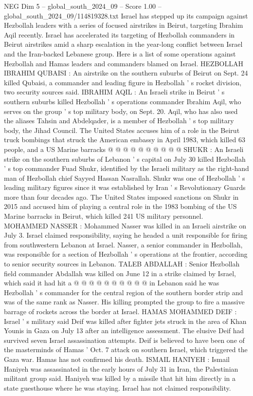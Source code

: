 \begin{textsample}{NEG Dim 5 – global\_south\_2024\_09 – Score 1.00 – global\_south\_2024\_09/114819328.txt}  \label{ex:f5_neg_221}
Israel has stepped up its campaign against Hezbollah leaders with a series of focused airstrikes in Beirut, targeting Ibrahim Aqil recently.
Israel has accelerated its targeting of Hezbollah commanders in Beirut airstrikes amid a sharp escalation in the year-long conflict between Israel and the Iran-backed Lebanese group.
Here is a list of some operations against Hezbollah and Hamas leaders and commanders blamed on Israel.
HEZBOLLAH IBRAHIM QUBAISI : An airstrike on the southern suburbs of Beirut on Sept. 24 killed Qubaisi, a commander and leading figure in Hezbollah ' s rocket division, two security sources said.
IBRAHIM AQIL : An Israeli strike in Beirut ' s southern suburbs killed Hezbollah ' s operations commander Ibrahim Aqil, who serves on the group ' s top military body, on Sept. 20.
Aqil, who has also used the aliases Tahsin and Abdelqader, is a member of Hezbollah ' s top military body, the Jihad Council.
The United States accuses him of a role in the Beirut truck bombings that struck the American embassy in April 1983, which killed 63 people, and a US Marine barracks @ @ @ @ @ @ @ @ @ @ SHUKR : An Israeli strike on the southern suburbs of Lebanon ' s capital on July 30 killed Hezbollah ' s top commander Fuad Shukr, identified by the Israeli military as the right-hand man of Hezbollah chief Sayyed Hassan Nasrallah.
Shukr was one of Hezbollah ' s leading military figures since it was established by Iran ' s Revolutionary Guards more than four decades ago.
The United States imposed sanctions on Shukr in 2015 and accused him of playing a central role in the 1983 bombing of the US Marine barracks in Beirut, which killed 241 US military personnel.
MOHAMMED NASSER : Mohammed Nasser was killed in an Israeli airstrike on July 3.
Israel claimed responsibility, saying he headed a unit responsible for firing from southwestern Lebanon at Israel.
Nasser, a senior commander in Hezbollah, was responsible for a section of Hezbollah ' s operations at the frontier, according to senior security sources in Lebanon.
TALEB ABDALLAH : Senior Hezbollah field commander Abdallah was killed on June 12 in a strike claimed by Israel, which said it had hit a @ @ @ @ @ @ @ @ @ @ in Lebanon said he was Hezbollah ' s commander for the central region of the southern border strip and was of the same rank as Nasser.
His killing prompted the group to fire a massive barrage of rockets across the border at Israel.
HAMAS MOHAMMED DEIF : Israel ' s military said Deif was killed after fighter jets struck in the area of Khan Younis in Gaza on July 13 after an intelligence assessment.
The elusive Deif had survived seven Israel assassination attempts.
Deif is believed to have been one of the masterminds of Hamas ' Oct. 7 attack on southern Israel, which triggered the Gaza war.
Hamas has not confirmed his death.
ISMAIL HANIYEH : Ismail Haniyeh was assassinated in the early hours of July 31 in Iran, the Palestinian militant group said.
Haniyeh was killed by a missile that hit him directly in a state guesthouse where he was staying.
Israel has not claimed responsibility.

\end{textsample}
